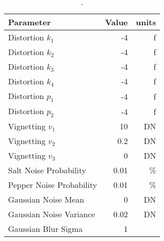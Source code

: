 \begin{table}[htbp]
  \centering
  \caption{.}
    \begin{tabular}{lrr}
    	\toprule
    Parameter & Value & units \\
    \midrule
    Distortion $k_1$ & -4    & f \\
    Distortion $k_2$ & -4    & f \\
    Distortion $k_3$ & -4    & f \\
    Distortion $k_4$ & -4    & f \\
    Distortion $p_1$ & -4    & f \\
    Distortion $p_2$ & -4    & f \\
	Vignetting $v_1$ & 10    & DN \\	
    Vignetting $v_2$ & 0.2   & DN \\
    Vignetting $v_3$ & 0     & DN \\
    Salt Noise Probability & 0.01 & \% \\
    Pepper Noise Probability & 0.01 & \% \\
    Gaussian Noise Mean & 0 & DN \\
    Gaussian Noise Variance & 0.02 & DN \\
    Gaussian Blur Sigma & 1 & \\
    \bottomrule
    \end{tabular}%
  \label{tab:postproc}%
\end{table}%